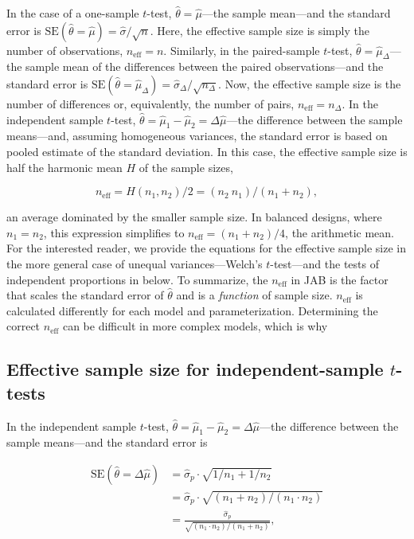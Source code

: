 \documentclass[
  man,
  floatsintext,
  longtable,
  nolmodern,
  notxfonts,
  notimes,
  colorlinks=true,linkcolor=blue,citecolor=blue,urlcolor=blue]{apa7}
\begin{document}
In the case of a one-sample \(t\)-test, \(\hat \theta = \hat \mu\)---the
sample mean---and the standard error is
\(\text{SE}(\hat \theta = \hat \mu) = \hat \sigma / \sqrt{n}\). Here,
the effective sample size is simply the number of observations,
\(n_\text{eff} = n\). Similarly, in the paired-sample \(t\)-test,
\(\hat \theta = \hat \mu_\Delta\)---the sample mean of the differences
between the paired observations---and the standard error is
\(\text{SE}(\hat \theta = \hat \mu_\Delta) = \hat \sigma_\Delta / \sqrt{n_\Delta}\).
Now, the effective sample size is the number of differences or,
equivalently, the number of pairs, \(n_\text{eff} = n_\Delta\). In the
independent sample \(t\)-test,
\(\hat \theta = \hat \mu_1 - \hat \mu_2 = \Delta \hat \mu\)---the
difference between the sample means---and, assuming homogeneous
variances, the standard error is based on pooled estimate of the
standard deviation. In this case, the effective sample size is half the
harmonic mean \(H\) of the sample sizes,

\[
n_\text{eff} = H(n_1, n_2) / 2 = (n_2~n_1) / (n_1 + n_2),
\]

an average dominated by the smaller sample size. In balanced designs,
where \(n_1 = n_2\), this expression simplifies to
\(n_\text{eff} = (n_1 + n_2) / 4\), the arithmetic mean. For the
interested reader, we provide the equations for the effective sample
size in the more general case of unequal variances---Welch's
\(t\)-test---and the tests of independent proportions in below. To
summarize, the \(n_\text{eff}\) in JAB is the factor that scales the
standard error of \(\hat \theta\) and is a \emph{function} of sample
size. \(n_\text{eff}\) is calculated differently for each model and
parameterization. Determining the correct \(n_\text{eff}\) can be
difficult in more complex models, which is why

\subsection{\texorpdfstring{Effective sample size for independent-sample
\(t\)-tests}{Effective sample size for independent-sample t-tests}}\label{effective-sample-size-for-independent-sample-t-tests}

In the independent sample \(t\)-test,
\(\hat \theta = \hat \mu_1 - \hat \mu_2 = \Delta \hat \mu\)---the
difference between the sample means---and the standard error is

\[
\begin{aligned}
\text{SE}(\hat \theta = \Delta \hat \mu) & = \hat \sigma_p \cdot \sqrt{1/n_1 + 1/n_2} \\
& = \hat \sigma_p \cdot \sqrt{(n_1 + n_2) / (n_1 \cdot n_2)} \\
& = \frac{ \hat \sigma_p }{ \sqrt{(n_1 \cdot n_2) / (n_1 + n_2)}},
\end{aligned}
\]
\end{document}

